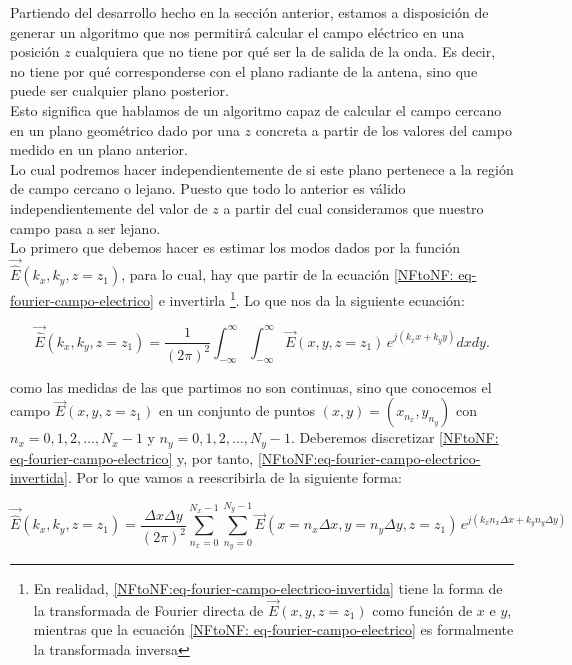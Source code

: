 \documentclass{article}
\begin{document}
Partiendo del desarrollo hecho en la sección anterior, estamos a disposición de generar un algoritmo que nos permitirá calcular el campo eléctrico en una posición $z$ cualquiera que no tiene por qué ser la de salida de la onda. Es decir, no tiene por qué corresponderse con el plano radiante de la antena, sino que puede ser cualquier plano posterior.\\
Esto significa que hablamos de un algoritmo capaz de calcular el campo cercano en un plano
geométrico dado por una $z$ concreta a partir de los valores del campo medido en un plano anterior.\\
Lo cual podremos hacer independientemente de si este plano pertenece a la región de campo cercano o lejano. Puesto que todo lo anterior es válido independientemente del valor de  $z$ a partir del cual consideramos que nuestro campo pasa a ser lejano.
\\

Lo primero que debemos hacer es estimar los modos dados por la función
$\vec{\hat{E}}(k_{x},k_{y},z=z_{1})$, para lo cual, hay que partir de la
ecuación \eqref{NFtoNF: eq-fourier-campo-electrico} e invertirla \footnote{En realidad, \eqref{NFtoNF:eq-fourier-campo-electrico-invertida} tiene la forma de
la transformada de Fourier directa de $\vec{E}(x,y,z=z_{1})$ como
función de $x$ e $y$, mientras que la ecuación \eqref{NFtoNF: eq-fourier-campo-electrico}
es formalmente la transformada inversa}. Lo que nos da la siguiente ecuación:

\begin{equation}
\vec{\hat{E}}(k_{x},k_{y},z=z_{1})=\frac{1}{(2\pi)^{2}}\int_{-\infty}^{\infty}\int_{-\infty}^{\infty}\vec{E}(x,y,z=z_{1})
\,e^{j (k_{x} x+k_{y} y)} dx dy.
\label{NFtoNF:eq-fourier-campo-electrico-invertida}
\end{equation}

como las medidas de las que partimos no son continuas, sino que conocemos
el campo $\vec{E}(x,y,z=z_{1})$ en un conjunto de puntos
$(x,y)=(x_{n_{x}},y_{n_{y}})$ con $n_{x}=0,1,2,\ldots,N_{x}-1$ y
$n_{y}=0,1,2,\ldots,N_{y}-1$. Deberemos discretizar \eqref{NFtoNF: eq-fourier-campo-electrico} y, por tanto,  \eqref{NFtoNF:eq-fourier-campo-electrico-invertida}. Por lo que vamos a reescribirla de la siguiente forma:

\begin{equation}
\vec{\hat{E}}(k_{x},k_{y},z=z_{1})=\frac{\Delta x
\Delta y}{(2\pi)^{2}}
\sum_{n_{x}=0}^{N_{x}-1}\sum_{n_{y}=0}^{N_{y}-1}\vec{E}(x=n_{x}\Delta
x,y=n_{y} \Delta y,z=z_{1}) \,e^{j (k_{x} n_{x} \Delta x+k_{y} n_{y}
\Delta y)}
\label{NFtoNF:eq-fourier-campo-electrico-invertida-discretizada}
\end{equation}
\end{document}
